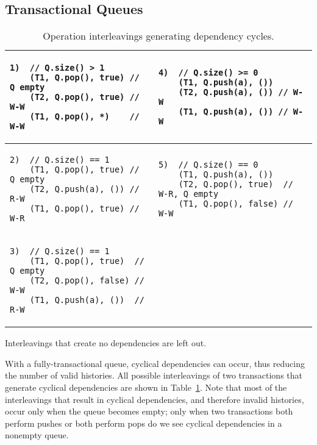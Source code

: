\subsection{Transactional Queues}

\begin{table}
    \centering
    \begin{tabular}{|l|l|}
        \hline
\begin{lstlisting}
1)  // Q.size() > 1 
    (T1, Q.pop(), true) // Q empty 
    (T2, Q.pop(), true) // W-W
    (T1, Q.pop(), *)    // W-W
\end{lstlisting}
        &
\begin{lstlisting}
4)  // Q.size() >= 0 
    (T1, Q.push(a), ()) 
    (T2, Q.push(a), ()) // W-W
    (T1, Q.push(a), ()) // W-W
\end{lstlisting}
\\
\hline
\begin{lstlisting}
2)  // Q.size() == 1  
    (T1, Q.pop(), true) // Q empty  
    (T2, Q.push(a), ()) // R-W
    (T1, Q.pop(), true) // W-R
    \end{lstlisting}
        &
\begin{lstlisting}
5)  // Q.size() == 0 
    (T1, Q.push(a), ())       
    (T2, Q.pop(), true)  // W-R, Q empty
    (T1, Q.pop(), false) // W-W
\end{lstlisting}
\\
    \hline
    \begin{lstlisting}
3)  // Q.size() == 1  
    (T1, Q.pop(), true)  // Q empty  
    (T2, Q.pop(), false) // W-W     
    (T1, Q.push(a), ())  // R-W     
    \end{lstlisting} &\\
        \hline
\end{tabular}
    \caption*{Interleavings that create no dependencies are left out.}
    \caption{Operation interleavings generating dependency cycles.}
    \label{tab:interleavings}
\end{table}

With a fully-transactional queue, cyclical dependencies can occur, thus reducing the number of valid histories. All possible interleavings of two transactions that generate cyclical dependencies are shown in Table~\ref{tab:interleavings}. Note that most of the interleavings that result in cyclical dependencies, and therefore invalid histories, occur only when the queue becomes empty; only when two transactions both perform pushes or both perform pops do we see cyclical dependencies in a nonempty queue. 

